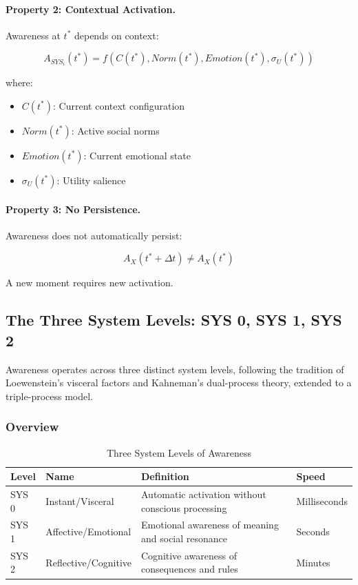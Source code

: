 \paragraph{Property 2: Contextual Activation.}
Awareness at $t^*$ depends on context:

\begin{equation}
A_{SYS_i}(t^*) = f(C(t^*), Norm(t^*), Emotion(t^*), \sigma_U(t^*))
\end{equation}

where:
\begin{itemize}
\item $C(t^*)$: Current context configuration
\item $Norm(t^*)$: Active social norms
\item $Emotion(t^*)$: Current emotional state
\item $\sigma_U(t^*)$: Utility salience
\end{itemize}

\paragraph{Property 3: No Persistence.}
Awareness does not automatically persist:

\begin{equation}
A_X(t^* + \Delta t) \neq A_X(t^*)
\end{equation}

A new moment requires new activation.

\subsection{The Three System Levels: SYS 0, SYS 1, SYS 2}
\label{subsec:system-levels}

Awareness operates across three distinct system levels, following the
tradition of Loewenstein's visceral factors and Kahneman's dual-process theory,
extended to a triple-process model.

\subsubsection{Overview}

\begin{table}[htbp]
\centering
\caption{Three System Levels of Awareness}
\label{tab:system-levels}
\renewcommand{\arraystretch}{1.4}
\begin{tabular}{@{}llll@{}}
\toprule
\textbf{Level} & \textbf{Name} & \textbf{Definition} & \textbf{Speed} \\
\midrule
SYS 0 & Instant/Visceral & Automatic activation without conscious processing & Milliseconds \\
SYS 1 & Affective/Emotional & Emotional awareness of meaning and social resonance & Seconds \\
SYS 2 & Reflective/Cognitive & Cognitive awareness of consequences and rules & Minutes \\
\bottomrule
\end{tabular}
\end{table}

